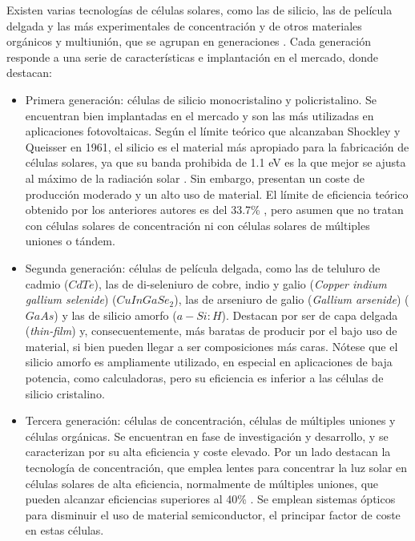 Existen varias tecnologías de células solares, como las de silicio, las de película delgada y las más experimentales de concentración y de otros materiales orgánicos y multiunión, que se agrupan en generaciones \cite{Shubbak_2019}. Cada generación responde a una serie de características e implantación en el mercado, donde destacan:

\begin{itemize}
    \item Primera generación: células de silicio monocristalino y policristalino.
          Se encuentran bien implantadas en el mercado y son las más utilizadas en aplicaciones fotovoltaicas. Según el límite teórico que alcanzaban Shockley y Queisser en 1961, el silicio es el material más apropiado para la fabricación de células solares, ya que su banda prohibida de 1.1 eV es la que mejor se ajusta al máximo de la radiación solar \cite[][p. 1126]{böer2002survey}. Sin embargo, presentan un coste de producción moderado y un alto uso de material. El límite de eficiencia teórico obtenido por los anteriores autores es del 33.7\% \cite{Shockley_Queisser_1961}, pero asumen que no tratan con células solares de concentración ni con células solares de múltiples uniones o tándem.
    \item Segunda generación: células de película delgada, como las de teluluro de cadmio ($CdTe$), las de di-seleniuro de cobre, indio y galio (\textit{Copper indium gallium selenide}) ($CuInGaSe_2$), las de arseniuro de galio (\textit{Gallium arsenide}) ($GaAs$) y las de silicio amorfo ($a-Si:H$).
          Destacan por ser de capa delgada (\textit{thin-film}) y, consecuentemente, más baratas de producir por el bajo uso de material, si bien pueden llegar a ser composiciones más caras.
          Nótese que el silicio amorfo es ampliamente utilizado, en especial en aplicaciones de baja potencia, como calculadoras, pero su eficiencia es inferior a las células de silicio cristalino.
    \item Tercera generación: células de concentración, células de múltiples uniones y células orgánicas.
          Se encuentran en fase de investigación y desarrollo, y se caracterizan por su alta eficiencia y coste elevado.
          Por un lado destacan la tecnología de concentración, que emplea lentes para concentrar la luz solar en células solares de alta eficiencia, normalmente de múltiples uniones, que pueden alcanzar eficiencias superiores al 40\% \cite[][Tabla 5]{Green_Dunlop_Yoshita_Kopidakis_Bothe_Siefer_Hao_2024}. Se emplean sistemas ópticos para disminuir el uso de material semiconductor, el principar factor de coste en estas células.
\end{itemize}

